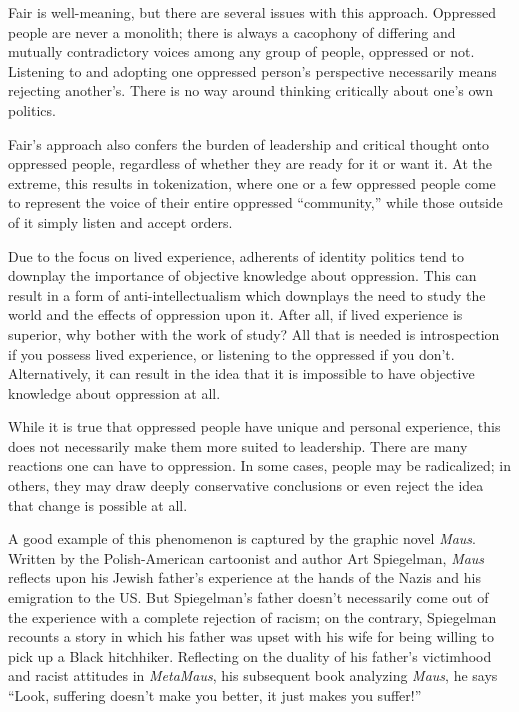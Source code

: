 Fair is well-meaning, but there are several issues with this approach. Oppressed people are never a monolith; there is always a cacophony of differing and mutually contradictory voices among any group of people, oppressed or not. Listening to and adopting one oppressed person's perspective necessarily means rejecting another's. There is no way around thinking critically about one's own politics.

Fair's approach also confers the burden of leadership and critical thought onto oppressed people, regardless of whether they are ready for it or want it. At the extreme, this results in tokenization, where one or a few oppressed people come to represent the voice of their entire oppressed ``community,'' while those outside of it simply listen and accept orders.

Due to the focus on lived experience, adherents of identity politics tend to downplay the importance of objective knowledge about oppression. This can result in a form of anti-intellectualism which downplays the need to study the world and the effects of oppression upon it. After all, if lived experience is superior, why bother with the work of study? All that is needed is introspection if you possess lived experience, or listening to the oppressed if you don't. Alternatively, it can result in the idea that it is impossible to have objective knowledge about oppression at all.

While it is true that oppressed people have unique and personal experience, this does not necessarily make them more suited to leadership. There are many reactions one can have to oppression. In some cases, people may be radicalized; in others, they may draw deeply conservative conclusions or even reject the idea that change is possible at all.

A good example of this phenomenon is captured by the graphic novel \emph{Maus}. Written by the Polish-American cartoonist and author Art Spiegelman, \emph{Maus} reflects upon his Jewish father's experience at the hands of the Nazis and his emigration to the US. But Spiegelman's father doesn't necessarily come out of the experience with a complete rejection of racism; on the contrary, Spiegelman recounts a story in which his father was upset with his wife for being willing to pick up a Black hitchhiker. Reflecting on the duality of his father's victimhood and racist attitudes in \emph{MetaMaus}, his subsequent book analyzing \emph{Maus}, he says ``Look, suffering doesn't make you better, it just makes you suffer!''

